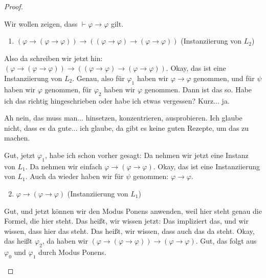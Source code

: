 \begin{proof}
\begin{math-stroke}
Wir wollen zeigen, dass $\vdash \varphi \rightarrow \varphi$ gilt.
\begin{enumerate}[label=$\varphi_{\mathbf{\arabic*}}:$]
    \setcounter{enumi}{0} \item $(\varphi \rightarrow (\varphi \rightarrow \varphi)) \rightarrow ((\varphi \rightarrow \varphi) \rightarrow (\varphi \rightarrow \varphi))$ \hfill (Instanziierung von $L_2$)
\end{enumerate}
\end{math-stroke}

\begin{spoken-clean}[00:35:00 - 00:36:23]
Also da schreiben wir jetzt hin: $(\varphi \rightarrow (\varphi \rightarrow \varphi)) \rightarrow ((\varphi \rightarrow \varphi) \rightarrow (\varphi \rightarrow \varphi))$. Okay, das ist eine Instanziierung von $L_2$. Genau, also für $\varphi_1$ haben wir $\varphi \rightarrow \varphi$ genommen, und für $\psi$ haben wir $\varphi$ genommen, für $\varphi_2$ haben wir $\varphi$ genommen. Dann ist das so. Habe ich das richtig hingeschrieben oder habe ich etwas vergessen? Kurz... ja.


Ah nein, das muss man... hinsetzen, konzentrieren, ausprobieren. Ich glaube nicht, dass es da gute... ich glaube, da gibt es keine guten Rezepte, um das zu machen.

Gut, jetzt $\varphi_1$, habe ich schon vorher gesagt: Da nehmen wir jetzt eine Instanz von $L_1$. Da nehmen wir einfach $\varphi \rightarrow (\varphi \rightarrow \varphi)$. Okay, das ist eine Instanziierung von $L_1$. Auch da wieder haben wir für $\psi$ genommen: $\varphi \rightarrow \varphi$.
\end{spoken-clean}

\begin{math-stroke}
\begin{enumerate}[label=$\varphi_{\mathbf{\arabic*}}:$]
    \setcounter{enumi}{1} \item $\varphi \rightarrow (\varphi \rightarrow \varphi)$ \hfill (Instanziierung von $L_1$)
\end{enumerate}
\end{math-stroke}

\begin{spoken-clean}[00:36:56 - 00:37:52]
Gut, und jetzt können wir den Modus Ponens anwenden, weil hier steht genau die Formel, die hier steht. Das heißt, wir wissen jetzt: Das impliziert das, und wir wissen, dass hier das steht. Das heißt, wir wissen, dass auch das da steht. Okay, das heißt $\varphi_2$, da haben wir $(\varphi \rightarrow (\varphi \rightarrow \varphi)) \rightarrow (\varphi \rightarrow \varphi)$. Gut, das folgt aus $\varphi_0$ und $\varphi_1$ durch Modus Ponens.
\end{spoken-clean}


\end{proof}
